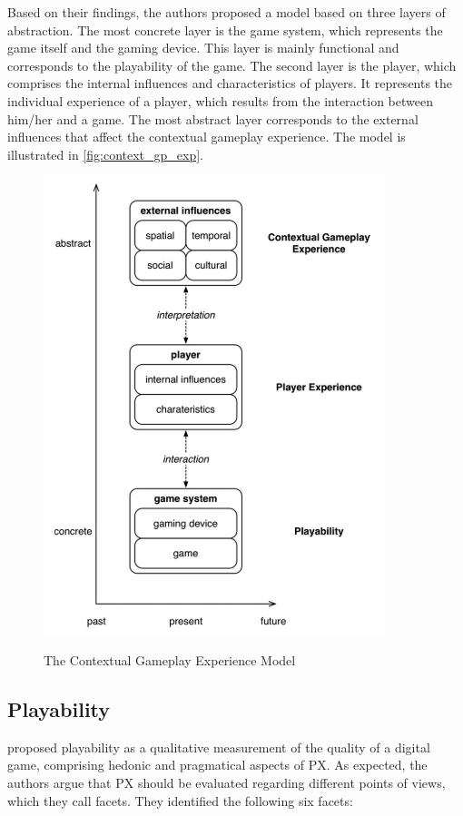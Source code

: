 Based on their findings, the authors proposed a model based on three layers of abstraction. The most concrete layer is the game system, which represents the game itself and the gaming device. This layer is mainly functional and corresponds to the playability of the game. The second layer is the player, which comprises the internal influences and characteristics of players. It represents the individual experience of a player, which results from the interaction between him/her and a game. The most abstract layer corresponds to the external influences that affect the contextual gameplay experience. The model is illustrated in \autoref{fig:context_gp_exp}.

\begin{figure}[bth]
\myfloatalign
{\includegraphics[width=.6\linewidth]{gfx/ref_framework/context_gp_exp}} \quad
\caption[The Contextual Gameplay Experience Model]{The Contextual Gameplay Experience Model \autocite{Engl2013}}\label{fig:context_gp_exp}
\end{figure}

\subsection{Playability}
\label{sec:playability}
\textcite{Sanchez2012} proposed playability as a qualitative measurement of the quality of a digital game, comprising hedonic and pragmatical aspects of \ac{PX}. As expected, the authors argue that \ac{PX} should be evaluated regarding different points of views, which they call facets. They identified the following six facets:

